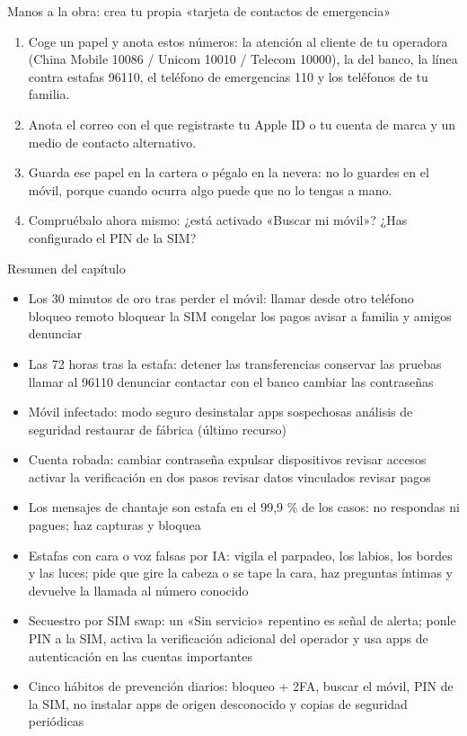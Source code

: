 \begin{tcbpractice}{Manos a la obra: crea tu propia «tarjeta de contactos de emergencia»}
\begin{enumerate}
  \item Coge un papel y anota estos números: la atención al cliente de tu operadora (China Mobile 10086 / Unicom 10010 / Telecom 10000), la del banco, la línea contra estafas 96110, el teléfono de emergencias 110 y los teléfonos de tu familia.
  \item Anota el correo con el que registraste tu Apple ID o tu cuenta de marca y un medio de contacto alternativo.
  \item Guarda ese papel en la cartera o pégalo en la nevera: no lo guardes en el móvil, porque cuando ocurra algo puede que no lo tengas a mano.
  \item Compruébalo ahora mismo: ¿está activado «Buscar mi móvil»? ¿Has configurado el PIN de la SIM?
\end{enumerate}

\end{tcbpractice}

\begin{tcbsummary}{Resumen del capítulo}
\begin{itemize}
  \item Los 30 minutos de oro tras perder el móvil: llamar desde otro teléfono bloqueo remoto bloquear la SIM congelar los pagos avisar a familia y amigos denunciar
  \item Las 72 horas tras la estafa: detener las transferencias conservar las pruebas llamar al 96110 denunciar contactar con el banco cambiar las contraseñas
  \item Móvil infectado: modo seguro desinstalar apps sospechosas análisis de seguridad restaurar de fábrica (último recurso)
  \item Cuenta robada: cambiar contraseña expulsar dispositivos revisar accesos activar la verificación en dos pasos revisar datos vinculados revisar pagos
  \item Los mensajes de chantaje son estafa en el 99,9 \% de los casos: no respondas ni pagues; haz capturas y bloquea
  \item Estafas con cara o voz falsas por IA: vigila el parpadeo, los labios, los bordes y las luces; pide que gire la cabeza o se tape la cara, haz preguntas íntimas y devuelve la llamada al número conocido
  \item Secuestro por SIM swap: un «Sin servicio» repentino es señal de alerta; ponle PIN a la SIM, activa la verificación adicional del operador y usa apps de autenticación en las cuentas importantes
  \item Cinco hábitos de prevención diarios: bloqueo + 2FA, buscar el móvil, PIN de la SIM, no instalar apps de origen desconocido y copias de seguridad periódicas
\end{itemize}

\end{tcbsummary}
